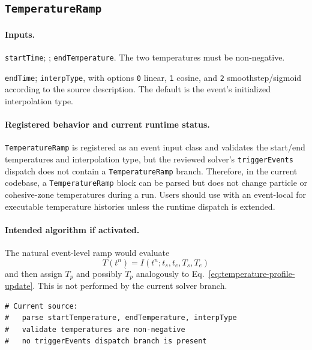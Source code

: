 \subsection{\texttt{TemperatureRamp}}
\label{subsec:event-temperature-ramp}

\paragraph{Inputs.}
\begin{description}[leftmargin=*,style=nextline]
\item[\textbf{Required.}] \texttt{startTime}; ; \texttt{endTemperature}.  The two temperatures must be non-negative.
\item[\textbf{Optional.}] \texttt{endTime}; \texttt{interpType}, with options \texttt{0} linear, \texttt{1} cosine, and \texttt{2} smoothstep/sigmoid according to the source description.  The default is the event's initialized interpolation type.
\end{description}

\paragraph{Registered behavior and current runtime status.}
\texttt{TemperatureRamp} is registered as an event input class and validates the start/end temperatures and interpolation type, but the reviewed solver's \texttt{triggerEvents} dispatch does not contain a \texttt{TemperatureRamp} branch.  Therefore, in the current codebase, a \texttt{TemperatureRamp} block can be parsed but does not change particle or cohesive-zone temperatures during a run.  Users should use  with an event-local  for executable temperature histories unless the runtime dispatch is extended.

\paragraph{Intended algorithm if activated.}
The natural event-level ramp would evaluate
\begin{equation}
  T(t^n)=I(t^n;t_s,t_e,T_s,T_e)
\end{equation}
and then assign $T_p$ and possibly $\dot{T}_p$ analogously to Eq.~\eqref{eq:temperature-profile-update}.  This is not performed by the current solver branch.

\begin{lstlisting}[caption={TemperatureRamp registered-input pseudocode.}]
# Current source:
#   parse startTemperature, endTemperature, interpType
#   validate temperatures are non-negative
#   no triggerEvents dispatch branch is present
\end{lstlisting}

